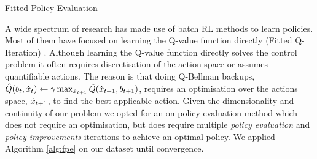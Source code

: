 \begin{center}
\begin{minipage}{.65\linewidth}
\begin{algorithm}[H]
\label{alg:fpe}
\BlankLine
{}
\caption{Fitted Policy Evaluation}
\end{algorithm} 
\end{minipage}
\end{center}
A wide spectrum of research has made use of batch RL methods to learn policies. 
Most of them have focused on learning the Q-value function directly (Fitted Q-Iteration) 
\cite{NIPS2008_3501,EGW05,Riedmiller05neuralfitted}. Although learning the 
Q-value function directly solves the control problem it often requires discretisation 
of the action space or assumes quantifiable actions. The reason is that doing 
Q-Bellman backups, $\hat{Q}(b_t,\dot{x}_t) \leftarrow \gamma \max_{\dot{x}_{t+1}} \hat{Q}(\dot{x}_{t+1},b_{t+1})$, 
requires an optimisation over the actions space, $\dot{x}_{t+1}$, to find the best applicable action. 
Given the dimensionality and continuity of our problem we opted for an on-policy evaluation method
which does not require an optimisation, but does require multiple 
\textit{policy evaluation} and \textit{policy improvements} iterations to achieve an optimal policy.
We applied Algorithm \ref{alg:fpe} on our dataset until convergence.



